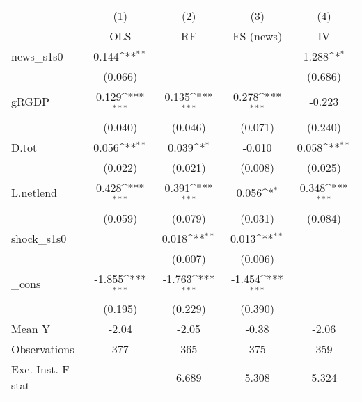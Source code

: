 {
\def\sym#1{\ifmmode^{#1}\else\(^{#1}\)\fi}
\begin{tabular}{l*{4}{c}}
\toprule
            &\multicolumn{1}{c}{(1)}&\multicolumn{1}{c}{(2)}&\multicolumn{1}{c}{(3)}&\multicolumn{1}{c}{(4)}\\
            &\multicolumn{1}{c}{OLS}&\multicolumn{1}{c}{RF}&\multicolumn{1}{c}{FS (news)}&\multicolumn{1}{c}{IV}\\
\midrule
news\_s1s0   &       0.144\sym{**} &                     &                     &       1.288\sym{*}  \\
            &     (0.066)         &                     &                     &     (0.686)         \\
\addlinespace
gRGDP       &       0.129\sym{***}&       0.135\sym{***}&       0.278\sym{***}&      -0.223         \\
            &     (0.040)         &     (0.046)         &     (0.071)         &     (0.240)         \\
\addlinespace
D.tot       &       0.056\sym{**} &       0.039\sym{*}  &      -0.010         &       0.058\sym{**} \\
            &     (0.022)         &     (0.021)         &     (0.008)         &     (0.025)         \\
\addlinespace
L.netlend   &       0.428\sym{***}&       0.391\sym{***}&       0.056\sym{*}  &       0.348\sym{***}\\
            &     (0.059)         &     (0.079)         &     (0.031)         &     (0.084)         \\
\addlinespace
shock\_s1s0  &                     &       0.018\sym{**} &       0.013\sym{**} &                     \\
            &                     &     (0.007)         &     (0.006)         &                     \\
\addlinespace
\_cons      &      -1.855\sym{***}&      -1.763\sym{***}&      -1.454\sym{***}&                     \\
            &     (0.195)         &     (0.229)         &     (0.390)         &                     \\
\midrule
Mean Y      &       -2.04         &       -2.05         &       -0.38         &       -2.06         \\
Observations&         377         &         365         &         375         &         359         \\
Exc. Inst. F-stat&                     &       6.689         &       5.308         &       5.324         \\
\bottomrule
\end{tabular}
}
